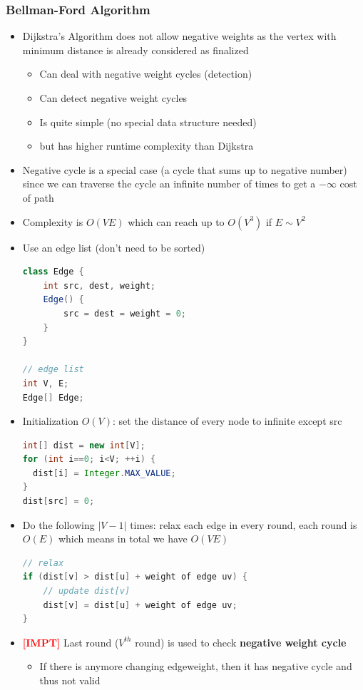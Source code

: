 \documentclass{article}
\newcommand{\impt}[0]{\textcolor{red}{\textbf{[IMPT] }}}
\begin{document}
\begin{multicols}{2}
\subsubsection{Bellman-Ford Algorithm}
\begin{itemize}
	\item Dijkstra's Algorithm does not allow negative weights as the vertex with minimum distance is already considered as finalized
	\begin{itemize}
		\item Can deal with negative weight cycles (detection)
		\item Can detect negative weight cycles
		\item Is quite simple (no special data structure needed)
		\item but has higher runtime complexity than Dijkstra
	\end{itemize}
	\item Negative cycle is a special case (a cycle that sums up to negative number) since we can traverse the cycle an infinite number of times to get a $- \infty$ cost of path
	\item Complexity is $O(VE)$ which can reach up to $O(V^3)$ if $E \sim V^2$
	\item Use an edge list (don't need to be sorted)
	\begin{lstlisting}[language=java]
class Edge {
	int src, dest, weight;
	Edge() {
		src = dest = weight = 0;
	}
}

// edge list
int V, E;
Edge[] Edge;
\end{lstlisting}
    \item Initialization $O(V)$: set the distance of every node to infinite except src
    \begin{lstlisting}[language=Java]
int[] dist = new int[V];
for (int i==0; i<V; ++i) {
  dist[i] = Integer.MAX_VALUE;
}
dist[src] = 0;
\end{lstlisting}
    \item Do the following $|V-1|$ times: relax each edge in every round, each round is $O(E)$ which means in total we have $O(VE)$
    \begin{lstlisting}[language=Java]
// relax
if (dist[v] > dist[u] + weight of edge uv) {
	// update dist[v]
	dist[v] = dist[u] + weight of edge uv;
}
\end{lstlisting}
\item \impt Last round ($V^{th}$ round) is used to check \textbf{negative weight cycle}
\begin{itemize}
	\item If there is anymore changing edgeweight, then it has negative cycle and thus not valid
\end{itemize}
\end{itemize}

\end{multicols}
\end{document}
